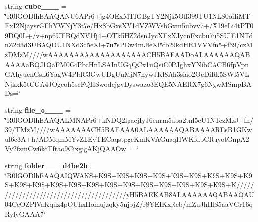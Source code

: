 \begin{DoxyCompactItemize}
string {\bfseries cube\+\_\+\_\+\_} = \char`\"{}R0l\+G\+O\+Dlh\+E\+A\+A\+Q\+A\+N\+U6\+A\+Pr6+jg4\+O\+Ex\+M\+T\+I\+G\+Bg\+T\+Y2\+Njk5\+Off399\+T\+U1\+N\+L\+S0oi\+Ii\+M\+T\+Ex\+I2\+Njaysr\+G\+Fh\+Y\+W\+Nj\+Y3t7e/Hx8b\+Gxs\+X\+V1d\+V\+Z\+W\+Vsb\+Gxm5ubvv7+/X19e\+Li4t\+P\+T09\+D\+Q0L+/v+np6\+U\+F\+B\+Qd\+X\+V1fj4+O\+Tk5\+H\+Z2dsn\+Jyc\+X\+Fx\+X\+Jycn\+Fxcbu7u5\+S\+Ul\+E1\+N\+Tdn\+Z2d3d3\+U\+B\+A\+Q\+D\+U1\+N\+Xd3d5e\+Xl+7u7s\+P\+Dw4m\+Jie\+Xl5fb29kd\+H\+R1\+V\+V\+Vfn5+f39/cz\+Mz\+D\+Mz\+M////w\+A\+A\+A\+A\+A\+A\+A\+A\+A\+A\+A\+A\+A\+A\+A\+A\+A\+A\+A\+C\+H5\+B\+A\+E\+A\+A\+Do\+A\+L\+A\+A\+A\+A\+A\+A\+Q\+A\+B\+A\+A\+A\+Aa\+B\+Q\+J1\+Qa\+F\+M0\+Gi\+Pbc\+Hn\+L\+S\+A\+In\+U\+Gq\+Q\+Cx1u\+Qsi\+C0\+P\+Jghx\+Y\+Nib\+C\+A\+C\+B6fp\+Vpn\+G\+Ahyucn\+Gs\+L6\+Yag\+W4\+Pld\+C3\+Gw\+U\+Dg\+Uu\+Mj\+N7hyw\+J\+Kl8\+Ah3siao2\+Oc\+Di\+Rk5\+S\+Wl5\+V\+L\+Njkxk5t\+C\+G\+A4\+J\+Ogcoh5sc\+F\+Q\+I\+I\+Swodejgv\+Dyswazo3\+E\+Q\+E5\+N\+A\+E\+R\+X7g6\+Ngw\+M\+Smp\+B\+A\+Ds=\char`\"{}
\item 
\mbox{\label{class_c_utils_1_1_utils_1_1_resources_1_1_icons_ae511484adf0a80407269ea076410dced}} 
string {\bfseries file\+\_\+o\+\_\+\_\+\_} = \char`\"{}R0l\+G\+O\+Dlh\+E\+A\+A\+Q\+A\+L\+M\+N\+A\+Pr6+k\+N\+D\+Q2lpacj\+Iy\+J6enrm5uba2tnl5e\+U1\+N\+Tcz\+MzJ+fn/39/T\+MzM////w\+A\+A\+A\+A\+A\+A\+A\+C\+H5\+B\+A\+E\+A\+A\+A0\+A\+L\+A\+A\+A\+A\+A\+A\+Q\+A\+B\+A\+A\+A\+A\+R\+Es\+B1\+G\+Kwul6c3A+h/A\+D\+Mqm\+M\+Yv\+Z\+L\+Ey\+T\+E\+Caqstpgc\+Km\+K\+V\+A\+Guaq\+H\+W\+Kfdb\+C\+Ruyot\+Gnp\+A2\+Vy2fzm\+Cw6kc\+Tftao9\+Cixgig\+A\+Kj\+Q\+A\+A\+Ow==\char`\"{}
\item 
\mbox{\label{class_c_utils_1_1_utils_1_1_resources_1_1_icons_a96f7dd9314915fac14d358de623dfbbc}} 
string {\bfseries folder\+\_\+\_\+\_\+d4be2b} = \char`\"{}R0l\+G\+O\+Dlh\+E\+A\+A\+Q\+A\+I\+Q\+W\+A\+NS+K9S+K9S+K9S+K9S+K9S+K9S+K9S+K9S+K9S+K9S+K9S+K9S+K9S+K9S+K9S+K9S+K9S+K9S+K9S+K9S+K9S+K////////////////////////////////////////y\+H5\+B\+A\+E\+K\+A\+B8\+A\+L\+A\+A\+A\+A\+A\+A\+Q\+A\+B\+A\+A\+Q\+A\+U04\+Ce\+O\+Z\+Pl\+Va\+Kquz4p\+O\+Uhx\+Homujzqky5njbjZ/r8\+Y\+E\+I\+Kx\+Reb/m\+Zu\+Jh\+Hl\+S5aa\+V\+Gr16q\+Ryly\+G\+A\+A\+A7\char`\"{}
\item 
\mbox{\label{class_c_utils_1_1_utils_1_1_resources_1_1_icons_a09d233da2d08db5e58ece97e1f653242}} 

\end{DoxyCompactItemize}
